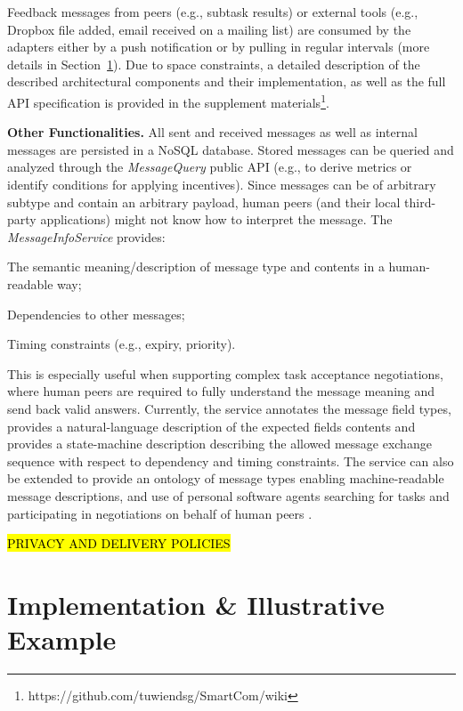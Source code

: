 \documentclass{llncs}
\newcommand{\mdl}{\textsc{SmartCom}}
\begin{document}
    Feedback messages from peers (e.g., subtask results) or external tools (e.g., Dropbox file added, email received on a mailing list) are consumed by the adapters either by a push notification or by pulling in regular intervals (more details in Section~\ref{sec:impl}). 
    Due to space constraints, a detailed description of the described architectural components and their implementation, as well as the full API specification is provided in the supplement materials\footnote{https://github.com/tuwiendsg/SmartCom/wiki}.\addtocounter{footnote}{-1}

  \textbf{Other Functionalities.}
    All sent and received messages as well as internal messages are persisted in a NoSQL database. Stored messages can be queried and analyzed through the \emph{MessageQuery} public API (e.g., to derive metrics or identify conditions for applying incentives).
    Since messages can be of arbitrary subtype and contain an arbitrary payload, human peers (and their local third-party applications) might not know how to interpret the message. The \emph{MessageInfoService} provides:
    \begin{inparaenum}[\itshape a)]
        \item The semantic meaning/description of message type and contents in a human-readable way; 
        \item Dependencies to other messages;
        \item Timing constraints (e.g., expiry, priority).
    \end{inparaenum}
    This is especially useful when supporting complex task acceptance negotiations, where human peers are required to fully understand the message meaning and send back valid answers. 
    Currently, the service annotates the message field types, provides a natural-language description of the expected fields contents and provides a state-machine description describing the allowed message exchange sequence with respect to dependency and timing constraints. The service can also be extended to provide an ontology of message types enabling machine-readable message descriptions, and use of personal software agents searching for tasks and participating in negotiations on behalf of human peers \cite{KobiGal}. 

    \hl{PRIVACY AND DELIVERY POLICIES}
 
      
\section{Implementation \& Illustrative Example}
\label{sec:impl}
\end{document}
